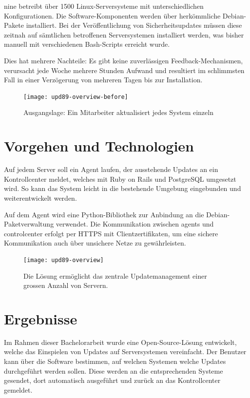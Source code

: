 \gls{nine} betreibt über 1500 Linux-Serversysteme mit unterschiedlichen Konfigurationen. Die Software-Komponenten werden über herkömmliche Debian-Pakete installiert. Bei der Veröffentlichung von Sicherheitsupdates müssen diese zeitnah auf sämtlichen betroffenen Serversystemen installiert werden, was bisher manuell mit verschiedenen Bash-Scripts erreicht wurde.

Dies hat mehrere Nachteile: Es gibt keine zuverlässigen Feedback-Mechanismen, verursacht jede Woche mehrere Stunden Aufwand und resultiert im schlimmsten Fall in einer Verzögerung von mehreren Tagen bis zur Installation.

\begin{figure}
  \centering
    \texttt{[image: upd89-overview-before]}
  \caption{Ausgangslage: Ein Mitarbeiter aktualisiert jedes System einzeln}
  \label{fig:overview-before}
\end{figure}

\section*{Vorgehen und Technologien}

Auf jedem Server soll ein Agent laufen, der ausstehende Updates an ein Kontrollcenter meldet, welches mit Ruby on Rails und PostgreSQL umgesetzt wird. So kann das System leicht in die bestehende Umgebung eingebunden und weiterentwickelt werden. 

Auf dem Agent wird eine Python-Bibliothek zur Anbindung an die Debian-Paketverwaltung verwendet. Die Kommunikation zwischen \glspl{agent} und \gls{controlcenter} erfolgt per HTTPS mit Clientzertifikaten, um eine sichere Kommunikation auch über unsichere Netze zu gewährleisten.

\begin{figure}
  \centering
    \texttt{[image: upd89-overview]}
  \caption{Die Lösung ermöglicht das zentrale Updatemanagement einer grossen Anzahl von Servern.}
  \label{fig:overview}
\end{figure}

\section*{Ergebnisse}   

Im Rahmen dieser Bachelorarbeit wurde eine Open-Source-Lösung entwickelt, welche das Einspielen von Updates auf Serversystemen vereinfacht. Der Benutzer kann über die Software bestimmen, auf welchen Systemen welche Updates durchgeführt werden sollen. Diese werden an die entsprechenden Systeme gesendet, dort automatisch ausgeführt und zurück an das Kontrollcenter gemeldet.


